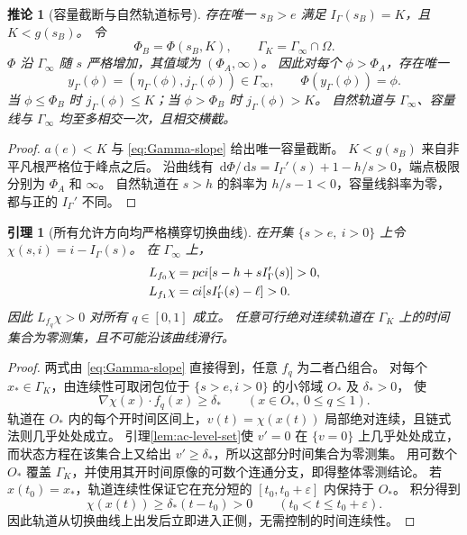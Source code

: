 \documentclass[11pt,a4paper,UTF8]{ctexart}
\newtheorem{lemma}[theorem]{引理}
\newtheorem{corollary}[theorem]{推论}
\theoremstyle{definition}
\newcommand{\dd}{\,\mathrm d}
\begin{document}
\begin{corollary}[容量截断与自然轨道标号]
\label{cor:Gamma-labels}
存在唯一 $s_B>e$ 满足 $I_\Gamma(s_B)=K$，且 $K<g(s_B)$。
令
\begin{equation}
\Phi_B=\Phi(s_B,K),\qquad \Gamma_K=\Gamma_\infty\cap\Omega.
\label{eq:PhiB}
\end{equation}
$\Phi$ 沿 $\Gamma_\infty$ 随 $s$ 严格增加，其值域为 $(\Phi_A,\infty)$。
因此对每个 $\phi>\Phi_A$，存在唯一
\begin{equation}
y_\Gamma(\phi)=(\eta_\Gamma(\phi),j_\Gamma(\phi))\in\Gamma_\infty,
\qquad \Phi(y_\Gamma(\phi))=\phi.
\label{eq:Gamma-hit-map}
\end{equation}
当 $\phi\le\Phi_B$ 时 $j_\Gamma(\phi)\le K$；当 $\phi>\Phi_B$ 时 $j_\Gamma(\phi)>K$。
自然轨道与 $\Gamma_\infty$、容量线与 $\Gamma_\infty$ 均至多相交一次，且相交横截。
\end{corollary}
\begin{proof}
$a(e)<K$ 与 \eqref{eq:Gamma-slope} 给出唯一容量截断。
$K<g(s_B)$ 来自非平凡根严格位于峰点之后。
沿曲线有 $\dd\Phi/\dd s=I_\Gamma'(s)+1-h/s>0$，端点极限分别为 $\Phi_A$ 和 $\infty$。
自然轨道在 $s>h$ 的斜率为 $h/s-1<0$，容量线斜率为零，都与正的 $I_\Gamma'$ 不同。
\end{proof}

\begin{lemma}[所有允许方向均严格横穿切换曲线]
\label{lem:strict-crossing}
在开集 $\{s>e,\ i>0\}$ 上令 $\chi(s,i)=i-I_\Gamma(s)$。
在 $\Gamma_\infty$ 上，
\begin{align}
L_{f_0}\chi&=pci[s-h+sI_\Gamma'(s)]>0,\notag\\
L_{f_1}\chi&=ci[sI_\Gamma'(s)-\ell]>0.\label{eq:strict-crossing}
\end{align}
因此 $L_{f_q}\chi>0$ 对所有 $q\in[0,1]$ 成立。
任意可行绝对连续轨道在 $\Gamma_K$ 上的时间集合为零测集，且不可能沿该曲线滑行。
\end{lemma}
\begin{proof}
两式由 \eqref{eq:Gamma-slope} 直接得到，任意 $f_q$ 为二者凸组合。
对每个 $x_*\in\Gamma_K$，由连续性可取闭包位于 $\{s>e,i>0\}$ 的小邻域 $O_*$ 及 $\delta_*>0$，
使
\[
\nabla\chi(x)\cdot f_q(x)\ge\delta_*\qquad(x\in O_*,\ 0\le q\le1).
\]
轨道在 $O_*$ 内的每个开时间区间上，$v(t)=\chi(x(t))$ 局部绝对连续，且链式法则几乎处处成立。
引理\ref{lem:ac-level-set}使 $v'=0$ 在 $\{v=0\}$ 上几乎处处成立，
而状态方程在该集合上又给出 $v'\ge\delta_*$，所以这部分时间集合为零测集。
用可数个 $O_*$ 覆盖 $\Gamma_K$，并使用其开时间原像的可数个连通分支，即得整体零测结论。
若 $x(t_0)=x_*$，轨道连续性保证它在充分短的 $[t_0,t_0+\varepsilon]$ 内保持于 $O_*$。
积分得到
\begin{equation}
\chi(x(t))\ge\delta_*(t-t_0)>0\qquad(t_0<t\le t_0+\varepsilon).
\label{eq:strict-crossing-time}
\end{equation}
因此轨道从切换曲线上出发后立即进入正侧，无需控制的时间连续性。
\end{proof}
\end{document}
